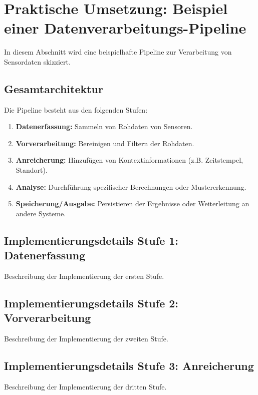 \documentclass[a4paper]{article} %
\begin{document}
\section{Praktische Umsetzung: Beispiel einer Datenverarbeitungs-Pipeline}
In diesem Abschnitt wird eine beispielhafte Pipeline zur Verarbeitung von Sensordaten skizziert.
\subsection{Gesamtarchitektur}
Die Pipeline besteht aus den folgenden Stufen:
\begin{enumerate}
    \item \textbf{Datenerfassung:} Sammeln von Rohdaten von Sensoren.
    \item \textbf{Vorverarbeitung:} Bereinigen und Filtern der Rohdaten.
    \item \textbf{Anreicherung:} Hinzufügen von Kontextinformationen (z.B. Zeitstempel, Standort).
    \item \textbf{Analyse:} Durchführung spezifischer Berechnungen oder Mustererkennung.
    \item \textbf{Speicherung/Ausgabe:} Persistieren der Ergebnisse oder Weiterleitung an andere Systeme.
\end{enumerate}
\blindtext[3]
\lipsum[8-10]

\subsection{Implementierungsdetails Stufe 1: Datenerfassung}
Beschreibung der Implementierung der ersten Stufe.
\blindtext[2]
\lipsum[11]

\subsection{Implementierungsdetails Stufe 2: Vorverarbeitung}
Beschreibung der Implementierung der zweiten Stufe.
\blindtext[2]
\lipsum[12]

\subsection{Implementierungsdetails Stufe 3: Anreicherung}
Beschreibung der Implementierung der dritten Stufe.
\blindtext[2]
\lipsum[13-14]
\end{document}
